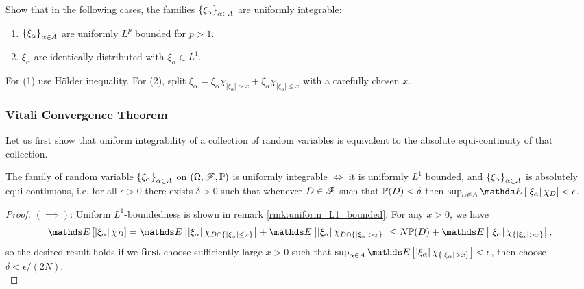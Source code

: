 \begin{unexaminable}
\begin{exercise}
Show that in the following cases, the families $\left\{ \xi_\alpha \right \}_{\alpha \in A}$ are uniformly integrable:
\begin{enumerate}
\item $\left\{ \xi_{\alpha} \right \}_{\alpha \in A}$ are uniformly $L^p$ bounded for $p>1$.
\item $\xi_{\alpha}$ are identically distributed with $\xi_\alpha \in L^1$.
\end{enumerate}
\end{exercise}

\begin{hint}
For (1) use H\"{o}lder inequality. For (2), split $\xi_\alpha = \xi_\alpha \chi_{|\xi_\alpha|>x} + \xi_\alpha \chi_{|\xi_\alpha|\leq x}$ with a carefully chosen $x$.
\end{hint}

\subsubsection{Vitali Convergence Theorem}
Let us first show that uniform integrability of a collection of random variables is equivalent to the absolute equi-continuity of that collection.
\begin{proposition} \label{prop:absolute_equicontinuity} The  family of random variable $\left\{ \xi_\alpha \right \}_{\alpha \in A}$ on $(\Omega,\mathcal{F},\mathbb{P})$ is uniformly integrable $\iff$ it is uniformly $L^1$ bounded, and $\left\{ \xi_\alpha \right \}_{\alpha \in A}$ is absolutely equi-continuous, i.e. for all $\epsilon > 0$ there exists $\delta > 0$ such that whenever $D \in \mathcal{F}$ such that $\mathbb{P}(D)<\delta$ then $\sup_{\alpha \in A} \E\sqbracket{\abs{\xi_\alpha} \chi_D} < \epsilon$. 
\end{proposition}

\begin{proof}
$(\implies)$: Uniform $L^1$-boundedness is shown in remark \ref{rmk:uniform_L1_bounded}. For any $x > 0$, we have
\begin{align}
    \E\sqbracket{\abs{\xi_\alpha} \chi_D} = \E\sqbracket{\abs{\xi_\alpha} \chi_{D \cap \set{|\xi_\alpha| \leq x}}} + \E\sqbracket{\abs{\xi_\alpha} \chi_{D \cap \set{|\xi_\alpha|>x}}} \leq N\p(D) + \E\sqbracket{\abs{\xi_\alpha} \chi_{\set{|\xi_\alpha|>x}}},
\end{align}
so the desired result holds if we \textbf{first} choose sufficiently large $x > 0$ such that $\sup_{\alpha \in A} \E\sqbracket{\abs{\xi_\alpha} \chi_{\set{|\xi_\alpha|>x}}} < \epsilon$, then choose $\delta < \epsilon/(2N)$. \\


\end{proof}
\end{unexaminable}
